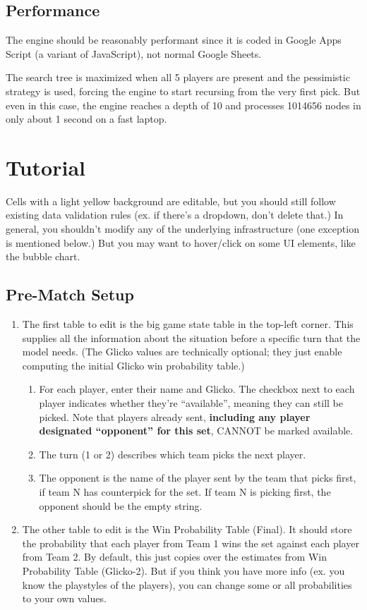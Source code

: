\documentclass[12pt]{article}
\begin{document}
		\subsection{Performance}
			The engine should be reasonably performant since it is coded in Google Apps Script (a variant of JavaScript), not normal Google Sheets.

			The search tree is maximized when all 5 players are present and the pessimistic strategy is used, forcing the engine to start recursing from the very first pick. But even in this case, the engine reaches a depth of 10 and processes 1014656 nodes in only about 1 second on a fast laptop.
	\newpage

	\section{Tutorial}
		Cells with a light yellow background are editable, but you should still follow existing data validation rules (ex. if there's a dropdown, don't delete that.) In general, you shouldn't modify any of the underlying infrastructure (one exception is mentioned below.) But you may want to hover/click on some UI elements, like the bubble chart.


		
		\subsection{Pre-Match Setup}
			\begin{enumerate}
				\item The first table to edit is the big game state table in the top-left corner. This supplies all the information about the situation before a specific turn that the model needs. (The Glicko values are technically optional; they just enable computing the initial Glicko win probability table.)
				\begin{enumerate}
					\item For each player, enter their name and Glicko. The checkbox next to each player indicates whether they're ``available'', meaning they can still be picked. Note that players already sent, \textbf{including any player designated ``opponent'' for this set}, CANNOT be marked available.
					\item The turn (1 or 2) describes which team picks the next player.
					\item The opponent is the name of the player sent by the team that picks first, if team N has counterpick for the set. If team N is picking first, the opponent should be the empty string.
				\end{enumerate}
				\item The other table to edit is the Win Probability Table (Final). It should store the probability that each player from Team 1 wins the set against each player from Team 2. By default, this just copies over the estimates from Win Probability Table (Glicko-2). But if you think you have more info (ex. you know the playstyles of the players), you can change some or all probabilities to your own values.
			\end{enumerate}
		
\end{document}
